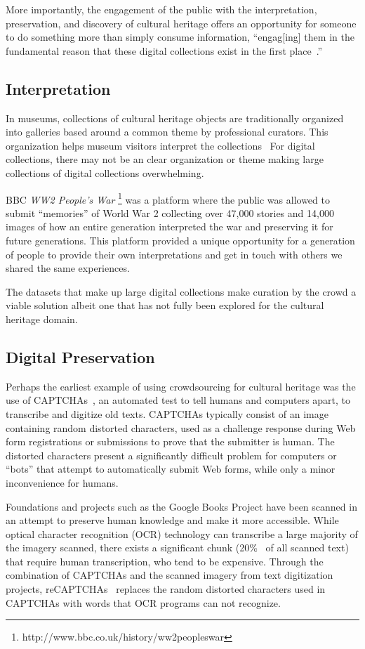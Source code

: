 \documentclass[10pt,twocolumn]{article}
\begin{document}
More importantly, the engagement of the public with the interpretation, 
preservation, and discovery of cultural heritage offers an opportunity for
someone to do something more than simply consume information, ``engag[ing] 
them in the fundamental reason that these digital collections exist in the 
first place~\cite{Owens2013}.''


\subsection{Interpretation}
In museums, collections of cultural heritage objects are traditionally organized
into galleries based around a common theme by professional curators. This
organization helps museum visitors interpret the collections~\cite{Aletras2012}
For digital collections, there may not be an clear organization or theme making
large collections of digital collections overwhelming. 

BBC \textit{WW2 People's War}
\footnote{http://www.bbc.co.uk/history/ww2peopleswar} was a platform
where the public was allowed to submit ``memories'' of World War 2 collecting 
over 47,000 stories and 14,000 images of how an entire generation 
interpreted the war and preserving it for future generations. This platform
provided a unique opportunity for a generation of people to provide their 
own interpretations and get in touch with others we shared the same 
experiences.

The datasets that make up large digital collections make curation by the crowd 
a viable solution albeit one that has not fully been explored for the cultural
heritage domain.


\subsection{Digital Preservation}
Perhaps the earliest example of using crowdsourcing for cultural heritage was
the use of CAPTCHAs~\cite{Ahn2003}, an automated test to tell humans and computers apart, to transcribe and digitize old texts. CAPTCHAs typically 
consist of an image containing random distorted characters, used as a challenge
response during Web form registrations or submissions to prove that the 
submitter is human. The distorted characters present a significantly 
difficult problem for computers or ``bots'' that attempt to automatically submit Web forms, while only a minor inconvenience for humans.

Foundations and projects such as the Google Books Project have been scanned 
in an attempt to preserve human knowledge and make it more accessible. While
optical character recognition (OCR) technology can transcribe a large majority
of the imagery scanned, there  exists a significant chunk 
(20\%~\cite{VonAhn2008a} of all scanned text) that require human transcription,
who tend to be expensive. Through the combination of CAPTCHAs and the scanned 
imagery from text digitization projects, reCAPTCHAs~\cite{VonAhn2008a} replaces 
the random distorted characters used in CAPTCHAs with words that OCR programs
can not recognize.
\end{document}
